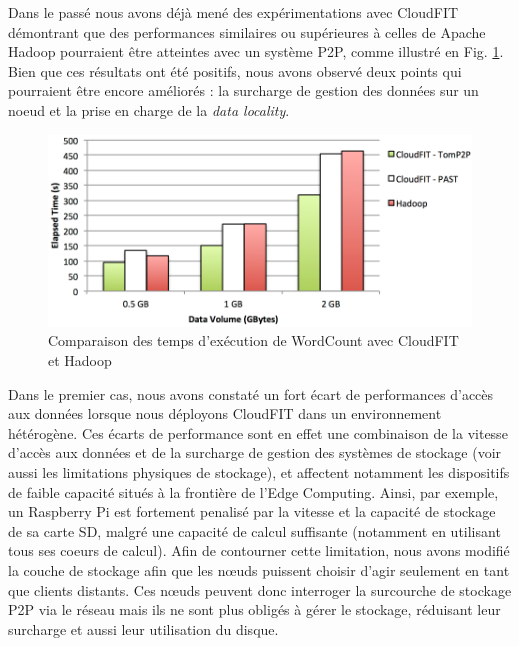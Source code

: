 Dans le passé \cite{Steffenel2015Roma} nous avons déjà mené des expérimentations avec CloudFIT démontrant que des performances similaires ou supérieures à celles de Apache Hadoop pourraient être atteintes avec un système P2P, comme illustré en Fig. \ref{fig:Hadoop}. Bien que ces résultats ont été positifs, nous avons observé deux points qui pourraient être encore améliorés : la surcharge de gestion des données sur un noeud et la prise en charge de la \textit{data locality}. 

\begin{figure}[!ht]
	\centering
	\includegraphics[width=1\linewidth]{img/CloudFIT-mesures.pdf}
	\caption{Comparaison des temps d'exécution de WordCount avec CloudFIT et Hadoop}
	\label{fig:Hadoop}
\end{figure}


Dans le premier cas, nous avons constaté un fort écart de performances d'accès aux données lorsque nous déployons CloudFIT  dans un environnement hétérogène. Ces écarts de performance sont en effet une combinaison de la vitesse d'accès aux données et de la surcharge de gestion des systèmes de stockage (voir aussi les limitations physiques de stockage), et affectent notamment les dispositifs de faible capacité situés à la frontière de l'Edge Computing. Ainsi, par exemple, un Raspberry Pi est fortement penalisé par la vitesse et la capacité de stockage de sa carte SD, malgré une capacité de calcul suffisante (notamment en utilisant tous ses coeurs de calcul).  Afin de contourner cette limitation, nous avons modifié la couche de stockage afin que les n\oe{}uds puissent choisir d'agir seulement en tant que clients distants. Ces n\oe{}uds peuvent donc interroger la surcourche de stockage P2P via le réseau mais ils ne sont plus obligés à gérer le stockage, réduisant leur surcharge et aussi leur utilisation du disque.

